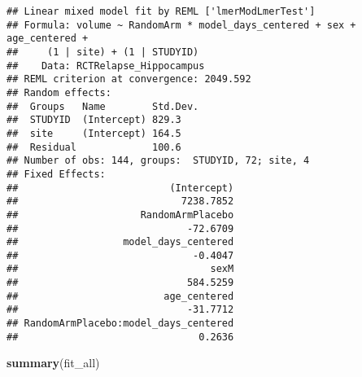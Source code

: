 \documentclass[]{article}
\newenvironment{Shaded}{\begin{snugshade}}{\end{snugshade}}
\newcommand{\KeywordTok}[1]{\textcolor[rgb]{0.13,0.29,0.53}{\textbf{#1}}}
\newcommand{\NormalTok}[1]{#1}
\theoremstyle{definition}
\theoremstyle{definition}
\theoremstyle{definition}
\theoremstyle{remark}
\begin{document}
\begin{verbatim}
## Linear mixed model fit by REML ['lmerModLmerTest']
## Formula: volume ~ RandomArm * model_days_centered + sex + age_centered +  
##     (1 | site) + (1 | STUDYID)
##    Data: RCTRelapse_Hippocampus
## REML criterion at convergence: 2049.592
## Random effects:
##  Groups   Name        Std.Dev.
##  STUDYID  (Intercept) 829.3   
##  site     (Intercept) 164.5   
##  Residual             100.6   
## Number of obs: 144, groups:  STUDYID, 72; site, 4
## Fixed Effects:
##                          (Intercept)  
##                            7238.7852  
##                     RandomArmPlacebo  
##                             -72.6709  
##                  model_days_centered  
##                              -0.4047  
##                                 sexM  
##                             584.5259  
##                         age_centered  
##                             -31.7712  
## RandomArmPlacebo:model_days_centered  
##                               0.2636
\end{verbatim}

\begin{Shaded}
\begin{Highlighting}[]
  \KeywordTok{summary}\NormalTok{(fit_all)}
\end{Highlighting}
\end{Shaded}
\end{document}
